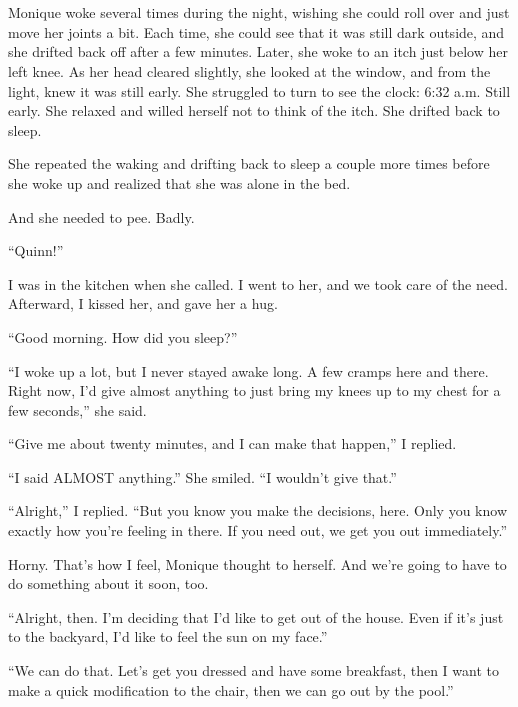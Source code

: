 \chapter{}
\begin{thought}
Monique woke several times during the night, wishing she could roll over and just move her
joints a bit. Each time, she could see that it was still dark outside, and she drifted back off
after a few minutes. Later, she woke to an itch just below her left knee. As her head cleared
slightly, she looked at the window, and from the light, knew it was still early. She struggled
to turn to see the clock: 6:32 a.m. Still early. She relaxed and willed herself not to think of
the itch. She drifted back to sleep.

She repeated the waking and drifting back to sleep a couple more times before she woke up
and realized that she was alone in the bed.

And she needed to pee. Badly.
\end{thought}

``Quinn!''

I was in the kitchen when she called. I went to her, and we took care of the need.
Afterward, I kissed her, and gave her a hug.

``Good morning. How did you sleep?''

``I woke up a lot, but I never stayed awake long. A few cramps here and there. Right now,
I'd give almost anything to just bring my knees up to my chest for a few seconds,'' she said.

``Give me about twenty minutes, and I can make that happen,'' I replied.

``I said ALMOST anything.'' She smiled. ``I wouldn't give that.''

``Alright,'' I replied. ``But you know you make the decisions, here. Only you know exactly how
you're feeling in there. If you need out, we get you out immediately.''

\begin{thought}
Horny. That's how I feel, Monique thought to herself. And we're going to have to do
something about it soon, too.
\end{thought}

``Alright, then. I'm deciding that I'd like to get out of the house. Even if it's just to the
backyard, I'd like to feel the sun on my face.''

``We can do that. Let's get you dressed and have some breakfast, then I want to make a quick
modification to the chair, then we can go out by the pool.''

